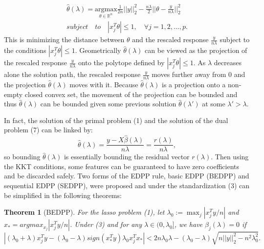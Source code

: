 \documentclass{article}
\newtheorem{theorem}{Theorem}[section]
\begin{document}
\begin{equation}
    \begin{split}
        \hat{\theta}(\lambda) = \underset{\theta\in \mathbb{R}^n}{\mathrm{argmax}}\frac{1}{2n}||y||_2^2-\frac{n\lambda}{2}||\theta-\frac{y}{n\lambda}||_2^2\\
        subject\quad to\quad |x_j^T\theta|\leq 1,\quad \forall j=1,2,...,p.
    \end{split}
\end{equation}
This is minimizing the distance between $\theta$ and the rescaled response $\frac{y}{n\lambda}$ subject to the conditions $|x_j^T\theta|\leq 1$. Geometrically $\hat{\theta}(\lambda)$ can be viewed as the projection of the rescaled response $\frac{y}{n\lambda}$ onto the polytope defined by $|x_j^T\theta|\leq 1$. As $\lambda$ decreases alone the solution path, the rescaled response $\frac{y}{n\lambda}$ moves further away from 0 and the projection $\hat{\theta}(\lambda)$ moves with it. Because $\hat{\theta}(\lambda)$ is a projection onto a non-empty closed convex set, the movement of the projection can be bounded and thus $\hat{\theta}(\lambda)$ can be bounded given some previous solution $\hat{\theta}(\lambda')$ at some $\lambda'>\lambda$.

In fact, the solution of the primal problem (1) and the solution of the dual problem (7) can be linked by:
\begin{equation}
    \hat{\theta}(\lambda)=\frac{y-X\hat{\beta}(\lambda)}{n\lambda}=\frac{r(\lambda)}{n\lambda},
\end{equation}
so bounding $\hat{\theta}(\lambda)$ is essentially bounding the residual vector $r(\lambda)$. Then using the KKT conditions, some features can be guaranteed to have zero coefficients and be discarded safely. Two forms of the EDPP rule, basic EDPP (BEDPP) and sequential EDPP (SEDPP)\cite{wang2013lasso}, were proposed and under the standardization (3) can be simplified in the following theorems\cite{zeng2017efficient}:

\begin{theorem}[BEDPP]
    For the lasso problem (1), let $\lambda_0:=\max_j|x_j^Ty/n|$ and $x_*=argmax_{x_j}|x_j^Ty/n|$. Under (3) and for any $\lambda\in(0,\lambda_0]$, we have $\hat{\beta}_j(\lambda)=0$ if
    \begin{equation}
        |(\lambda_0+\lambda)x_j^Ty-(\lambda_0-\lambda)sign(x_*^Ty)\lambda_0x_j^Tx_*|<2n\lambda_0\lambda-(\lambda_0-\lambda)\sqrt{n||y||_2^2-n^2\lambda_0^2}.
    \end{equation}
\end{theorem}
\end{document}
